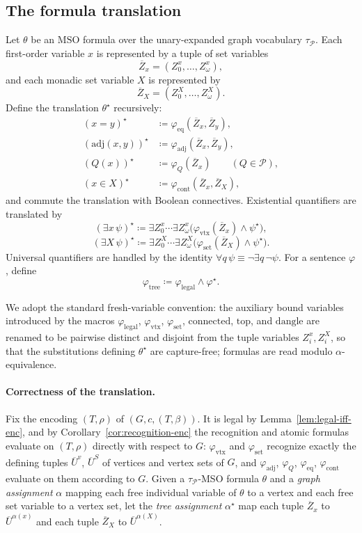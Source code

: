 \documentclass[11pt]{article}
\theoremstyle{definition}
\newcommand{\MSO}{\ensuremath{\mathrm{MSO}}}
\newcommand{\defeq}{\coloneqq}
\newcommand{\topnode}{\mathrm{top}}
\newcommand{\legal}{\mathrm{legal}}
\newcommand{\vtx}{\mathrm{vtx}}
\newcommand{\set}{\mathrm{set}}
\newcommand{\adj}{\mathrm{adj}}
\newcommand{\Pred}{\mathcal P}
\newcommand{\eq}{\mathrm{eq}}
\newcommand{\cont}{\mathrm{cont}}
\newcommand{\conn}{\mathrm{connected}}
\newcommand{\dang}{\mathrm{dangle}}
\newcommand{\tuple}[1]{\overline{#1}}
\begin{document}
\subsection{The formula translation}

Let \(\theta\) be an \MSO{} formula over the unary-expanded graph vocabulary
\(\tau_{\Pred}\).  Each first-order variable \(x\) is represented by a tuple of
set variables
\[
  \tuple Z_x=(Z^x_0,\ldots,Z^x_\omega),
\]
and each monadic set variable \(X\) is represented by
\[
  \tuple Z_X=(Z^X_0,\ldots,Z^X_\omega).
\]
Define the translation \(\theta^\star\) recursively:
\begin{align*}
  (x=y)^\star &\defeq \varphi_{\eq}(\tuple Z_x,\tuple Z_y),\\
  (\adj(x,y))^\star &\defeq \varphi_{\adj}(\tuple Z_x,\tuple Z_y),\\
  (Q(x))^\star &\defeq \varphi_Q(\tuple Z_x)\qquad(Q\in\Pred),\\
  (x\in X)^\star &\defeq \varphi_{\cont}(\tuple Z_x,\tuple Z_X),
\end{align*}
and commute the translation with Boolean connectives.  Existential quantifiers
are translated by
\[
  (\exists x\,\psi)^\star
  \defeq
  \exists Z^x_0\cdots\exists Z^x_\omega
  \bigl(\varphi_{\vtx}(\tuple Z_x)\wedge \psi^\star\bigr),
\]
\[
  (\exists X\,\psi)^\star
  \defeq
  \exists Z^X_0\cdots\exists Z^X_\omega
  \bigl(\varphi_{\set}(\tuple Z_X)\wedge \psi^\star\bigr).
\]
Universal quantifiers are handled by the identity \(\forall q\,\psi\equiv
\neg\exists q\,\neg\psi\).  For a sentence \(\varphi\), define
\[
  \varphi_{\mathrm{tree}}\defeq \varphi_{\legal}\wedge\varphi^\star.
\]

We adopt the standard fresh-variable convention: the auxiliary bound variables
introduced by the macros \(\varphi_{\legal}\), \(\varphi_{\vtx}\),
\(\varphi_{\set}\), \(\conn\), \(\topnode\), and \(\dang\) are renamed to be
pairwise distinct and disjoint from the tuple variables \(Z^x_i,Z^X_i\), so that
the substitutions defining \(\theta^\star\) are capture-free; formulas are read
modulo \(\alpha\)-equivalence.

\paragraph{Correctness of the translation.}
Fix the encoding \((T,\rho)\) of \((G,c,(T,\beta))\).  It is legal by
Lemma~\ref{lem:legal-iff-enc}, and by Corollary~\ref{cor:recognition-enc} the
recognition and atomic formulas evaluate on \((T,\rho)\) directly with respect
to \(G\): \(\varphi_{\vtx}\) and \(\varphi_{\set}\) recognize exactly the
defining tuples \(\tuple U^v\), \(\tuple U^S\) of vertices and vertex sets of
\(G\), and \(\varphi_{\adj}\), \(\varphi_Q\), \(\varphi_{\eq}\),
\(\varphi_{\cont}\) evaluate on them according to \(G\).  Given a
\(\tau_{\Pred}\)-MSO{} formula \(\theta\) and a
\emph{graph assignment} \(\alpha\) mapping each free individual variable of
\(\theta\) to a vertex and each free set variable to a vertex set, let the
\emph{tree assignment} \(\alpha^\star\) map each tuple \(\tuple Z_x\) to
\(\tuple U^{\alpha(x)}\) and each tuple \(\tuple Z_X\) to \(\tuple U^{\alpha(X)}\).
\end{document}
